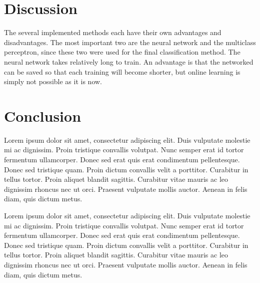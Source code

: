 \documentclass[11pt]{article}
\begin{document}
\section{Discussion}
The several implemented methods each have their own advantages and disadvantages. The most important two are the neural network and the multiclass perceptron, since these two were used for the final classification method. The neural network takes relatively long to train. An advantage is that the networked can be saved so that each training will become shorter, but online learning is simply not possible as it is now. 


\section{Conclusion}
Lorem ipsum dolor sit amet, consectetur adipiscing elit. Duis vulputate molestie mi ac dignissim. Proin tristique convallis volutpat. Nunc semper erat id tortor fermentum ullamcorper. Donec sed erat quis erat condimentum pellentesque. Donec sed tristique quam. Proin dictum convallis velit a porttitor. Curabitur in tellus tortor. Proin aliquet blandit sagittis. Curabitur vitae mauris ac leo dignissim rhoncus nec ut orci. Praesent vulputate mollis auctor. Aenean in felis diam, quis dictum metus.

Lorem ipsum dolor sit amet, consectetur adipiscing elit. Duis vulputate molestie mi ac dignissim. Proin tristique convallis volutpat. Nunc semper erat id tortor fermentum ullamcorper. Donec sed erat quis erat condimentum pellentesque. Donec sed tristique quam. Proin dictum convallis velit a porttitor. Curabitur in tellus tortor. Proin aliquet blandit sagittis. Curabitur vitae mauris ac leo dignissim rhoncus nec ut orci. Praesent vulputate mollis auctor. Aenean in felis diam, quis dictum metus.
\end{document}
